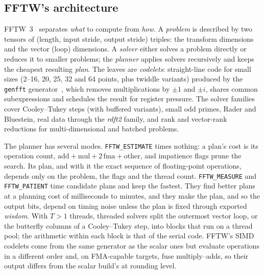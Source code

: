 \documentclass[10pt]{article}
\theoremstyle{definition}
\begin{document}
\subsection{FFTW's architecture}
FFTW~3~\cite{frigo2005fftw3} separates \emph{what} to compute from \emph{how}. A \emph{problem} is described by two tensors of (length, input stride, output stride) triples: the transform dimensions and the vector (loop) dimensions. A \emph{solver} either solves a problem directly or reduces it to smaller problems; the \emph{planner} applies solvers recursively and keeps the cheapest resulting \emph{plan}. The leaves are \emph{codelets}: straight-line code for small sizes (2--16, 20, 25, 32 and 64 points, plus twiddle variants) produced by the \texttt{genfft} generator~\cite{frigo1999genfft}, which removes multiplications by $\pm1$ and $\pm i$, shares common subexpressions and schedules the result for register pressure. The solver families cover Cooley--Tukey steps (with buffered variants), small odd primes, Rader and Bluestein, real data through the \emph{rdft2} family, and rank and vector-rank reductions for multi-dimensional and batched problems.

The planner has several modes. \texttt{FFTW\_ESTIMATE} times nothing: a plan's cost is its operation count, $\mathrm{add}+\mathrm{mul}+2\,\mathrm{fma}+\mathrm{other}$, and impatience flags prune the search. Its plan, and with it the exact sequence of floating-point operations, depends only on the problem, the flags and the thread count. \texttt{FFTW\_MEASURE} and \texttt{FFTW\_PATIENT} time candidate plans and keep the fastest. They find better plans at a planning cost of milliseconds to minutes, and they make the plan, and so the output bits, depend on timing noise unless the plan is fixed through exported \emph{wisdom}. With $T>1$ threads, threaded solvers split the outermost vector loop, or the butterfly columns of a Cooley--Tukey step, into blocks that run on a thread pool; the arithmetic within each block is that of the serial code. FFTW's SIMD codelets come from the same generator as the scalar ones but evaluate operations in a different order and, on FMA-capable targets, fuse multiply--adds, so their output differs from the scalar build's at rounding level.
\end{document}
